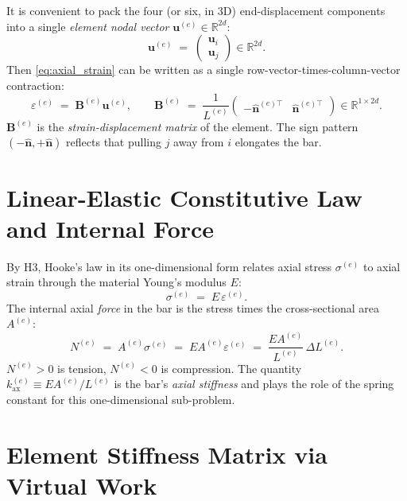 It is convenient to pack the four (or six, in 3D) end-displacement
components into a single \emph{element nodal vector}
$\mathbf{u}^{(e)}\in\mathbb{R}^{2d}$:
\begin{equation}
  \mathbf{u}^{(e)}
  \;=\;
  \begin{pmatrix}\mathbf{u}_i\\\mathbf{u}_j\end{pmatrix}
  \in\mathbb{R}^{2d}.
\end{equation}
Then \cref{eq:axial_strain} can be written as a single
row-vector-times-column-vector contraction:
\begin{equation}
  \varepsilon^{(e)}
  \;=\;\mathbf{B}^{(e)}\mathbf{u}^{(e)},
  \qquad
  \mathbf{B}^{(e)}
  \;=\;\frac{1}{L^{(e)}}
  \begin{pmatrix}-\hat{\mathbf{n}}^{(e)\top}
                   &\hat{\mathbf{n}}^{(e)\top}\end{pmatrix}
  \in\mathbb{R}^{1\times 2d}.
  \label{eq:strain_displacement}
\end{equation}
$\mathbf{B}^{(e)}$ is the \emph{strain-displacement matrix} of the
element. The sign pattern $(-\hat{\mathbf{n}},+\hat{\mathbf{n}})$
reflects that pulling $j$ away from $i$ elongates the bar.

\section{Linear-Elastic Constitutive Law and Internal Force}
\label{app:fem:constitutive}

By H3, Hooke's law in its one-dimensional form relates axial
stress $\sigma^{(e)}$ to axial strain through the material
Young's modulus $E$:
\begin{equation}
  \sigma^{(e)} \;=\; E\,\varepsilon^{(e)}.
  \label{eq:hooke1d}
\end{equation}
The internal axial \emph{force} in the bar is the stress times
the cross-sectional area $A^{(e)}$:
\begin{equation}
  N^{(e)} \;=\; A^{(e)}\sigma^{(e)}
           \;=\; EA^{(e)}\varepsilon^{(e)}
           \;=\; \frac{EA^{(e)}}{L^{(e)}}\,\Delta L^{(e)}.
  \label{eq:axial_force}
\end{equation}
$N^{(e)}>0$ is tension, $N^{(e)}<0$ is compression. The quantity
$k_{\mathrm{ax}}^{(e)}\equiv EA^{(e)}/L^{(e)}$ is the bar's
\emph{axial stiffness} and plays the role of the spring constant
for this one-dimensional sub-problem.

\section{Element Stiffness Matrix via Virtual Work}
\label{app:fem:elem_stiffness}


